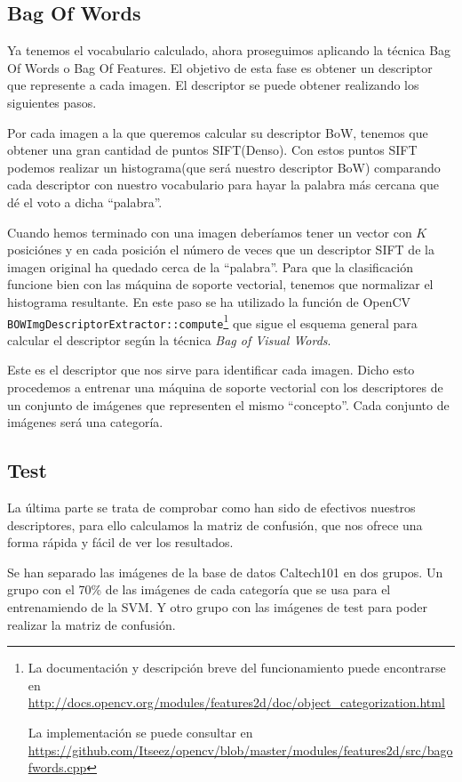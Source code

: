 \documentclass[a4paper,12pt]{article}
\begin{document}
\subsection{Bag Of Words}

Ya tenemos el vocabulario calculado, ahora proseguimos aplicando la técnica
Bag Of Words o Bag Of Features. El objetivo de esta fase es obtener un 
descriptor que represente a cada imagen. El descriptor se puede obtener
realizando los siguientes pasos.

Por cada imagen a la que queremos calcular su descriptor BoW, tenemos que 
obtener una gran cantidad de puntos SIFT(Denso). Con estos puntos SIFT podemos
realizar un histograma(que será nuestro descriptor BoW) comparando cada 
descriptor con nuestro vocabulario para hayar la palabra más cercana que 
dé el voto a dicha ``palabra''.

Cuando hemos terminado con una imagen deberíamos tener un vector con $K$ 
posiciónes y en cada posición el número de veces que un descriptor SIFT de la 
imagen original ha quedado cerca de la ``palabra''. Para que la clasificación
funcione bien con las máquina de soporte vectorial, tenemos que normalizar
el histograma resultante. En este paso se ha utilizado la función de OpenCV
\texttt{BOWImgDescriptorExtractor::compute}\footnote{ La documentación y 
descripción breve del funcionamiento puede encontrarse en
\url{http://docs.opencv.org/modules/features2d/doc/object_categorization.html}

La implementación se puede consultar en 
\url{https://github.com/Itseez/opencv/blob/master/modules/features2d/src/bagofwords.cpp}
} que sigue el esquema general para calcular el descriptor según la técnica
\emph{Bag of Visual Words}.

Este es el descriptor que nos sirve para identificar cada imagen. Dicho esto
procedemos a entrenar una máquina de soporte vectorial con los descriptores de
un conjunto de imágenes que representen el mismo ``concepto''.  Cada conjunto
de imágenes será una categoría. 

\subsection{Test}

La última parte se trata de comprobar como han sido de efectivos nuestros 
descriptores, para ello calculamos la matriz de confusión, que nos ofrece una 
forma rápida y fácil de ver los resultados.

Se han separado las imágenes de la base de datos Caltech101 en dos grupos.
Un grupo con el 70\% de las imágenes de cada categoría que se usa para el 
entrenamiendo de la SVM. Y otro grupo con las imágenes de test para poder
realizar la matriz de confusión.
\end{document}
